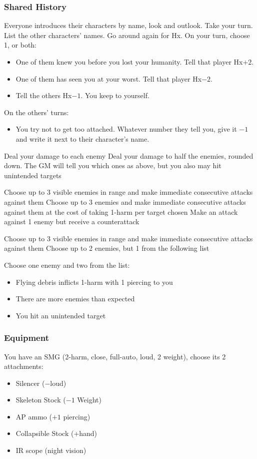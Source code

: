 \subsubsection{Shared History}
Everyone introduces their characters by name, look and outlook. Take
your turn.  List the other characters' names.  Go around again for
Hx. On your turn, choose 1, or both:
\begin{itemize}
\item One of them knew you before you lost your humanity. Tell that player Hx$+2$.
\item One of them has seen you at your worst. Tell that player Hx$-2$.
\item Tell the others Hx$-1$. You keep to yourself.
\end{itemize}
On the others’ turns:
\begin{itemize}
\item You try not to get too attached. Whatever number they tell you,
  give it $-1$ and write it next to their character’s name.
\end{itemize}

{Deal your damage to each enemy}
{Deal your damage to half the enemies, rounded down. The GM will tell you which ones}
{as above, but you also may hit unintended targets}

{Choose up to 3 visible enemies in range and make immediate consecutive attacks against them}
{Choose up to 3 enemies and make immediate consecutive attacks against them at the cost of taking 1-harm per target chosen}
{Make an attack against 1 enemy but receive a counterattack}

{Choose up to 3 visible enemies in range and make immediate consecutive attacks against them}
{Choose up to 2 enemies, but 1 from the following list}
{Choose one enemy and two from the list:
\begin{itemize}
\item Flying debris inflicts 1-harm with 1 piercing to you
\item There are more enemies than expected
\item You hit an unintended target
\end{itemize}}

\subsubsection{Equipment}
You have an SMG (2-harm, close, full-auto, loud, 2 weight), choose its 2 attachments:
\begin{itemize}
\item Silencer ($-$loud)
\item Skeleton Stock ($-1$ Weight)
\item AP ammo ($+1$ piercing)
\item Collapsible Stock (+hand)
\item IR scope (night vision)
\end{itemize}

